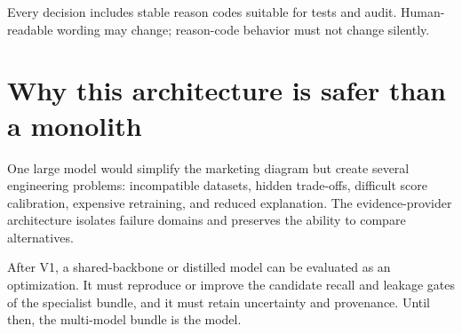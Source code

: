 Every decision includes stable reason codes suitable for tests and audit. Human-readable wording may change; reason-code behavior must not change silently.

\section{Why this architecture is safer than a monolith}

One large model would simplify the marketing diagram but create several engineering problems: incompatible datasets, hidden trade-offs, difficult score calibration, expensive retraining, and reduced explanation. The evidence-provider architecture isolates failure domains and preserves the ability to compare alternatives.

After V1, a shared-backbone or distilled model can be evaluated as an optimization. It must reproduce or improve the candidate recall and leakage gates of the specialist bundle, and it must retain uncertainty and provenance. Until then, the multi-model bundle is the model.
